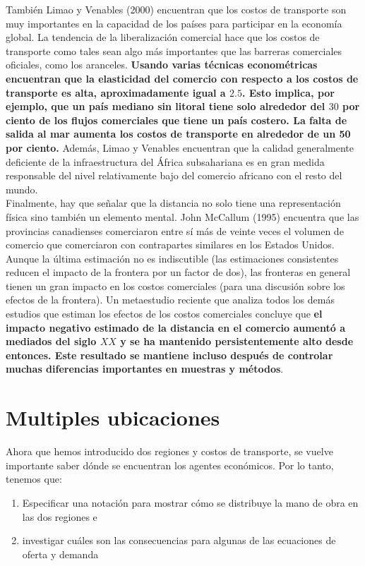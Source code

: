 También Limao y Venables (2000) encuentran que los costos de transporte son muy importantes en la capacidad de los países para participar en la economía global. La tendencia de la liberalización comercial hace que los costos de transporte como tales sean algo más importantes que las barreras comerciales oficiales, como los aranceles. \textbf{Usando varias técnicas econométricas encuentran que la elasticidad del comercio con respecto a los costos de transporte es alta, aproximadamente igual a $2.5$. Esto implica, por ejemplo, que un país mediano sin litoral tiene solo alrededor del $30$ por ciento de los flujos comerciales que tiene un país costero. La falta de salida al mar aumenta los costos de transporte en alrededor de un 50 por ciento.} Además, Limao y Venables encuentran que la calidad generalmente deficiente de la infraestructura del África subsahariana es en gran medida responsable del nivel relativamente bajo del comercio africano con el resto del mundo.\\
Finalmente, hay que señalar que la distancia no solo tiene una representación física sino también un elemento mental. John McCallum (1995) encuentra que las provincias canadienses comerciaron entre sí más de veinte veces el volumen de comercio que comerciaron con contrapartes similares en los Estados Unidos. Aunque la última estimación no es indiscutible (las estimaciones consistentes reducen el impacto de la frontera por un factor de dos), las fronteras en general tienen un gran impacto en los costos comerciales (para una discusión sobre los efectos de la frontera). Un metaestudio reciente que analiza todos los demás estudios que estiman los efectos de los costos comerciales concluye que \textbf{el impacto negativo estimado de la distancia en el comercio aumentó a mediados del siglo $XX$ y se ha mantenido persistentemente alto desde entonces. Este resultado se mantiene incluso después de controlar muchas diferencias importantes en muestras y métodos}.

\section{Multiples ubicaciones}
Ahora que hemos introducido dos regiones y costos de transporte, se vuelve importante saber dónde se encuentran los agentes económicos. Por lo tanto, tenemos que: 

\begin{enumerate}[\bfseries (i)]

    \item Especificar una notación para mostrar cómo se distribuye la mano de obra en las dos regiones e 
    \item investigar cuáles son las consecuencias para algunas de las ecuaciones de oferta y demanda 
\end{enumerate}

